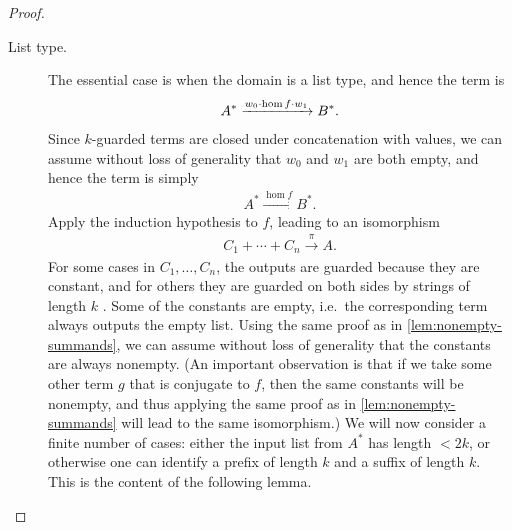 \begin{proof}
\begin{description}



    
    
    \item[List type.]
    The essential case is when the domain is a list type, and hence the  term is 
    \begin{align*}
    A^* \xrightarrow {w_0 \cdot \hom f \cdot w_1} B^*.
    \end{align*}
    Since $k$-guarded terms are closed under concatenation with values, we can assume without loss of generality that $w_0$ and $w_1$ are both empty, and hence the term is simply 
    \begin{align*}
    A^* \xrightarrow {\hom f} B^*.
    \end{align*}
    Apply the induction hypothesis to $f$, leading to an isomorphism
    \begin{align*}
     C_1 + \cdots + C_n \xrightarrow{\pi} A.
    \end{align*}
    For some cases in $C_1,\ldots,C_n$, the outputs are guarded because they are constant, and for others they are guarded on both sides by strings of length $k$ . Some of the constants are empty, i.e.~the corresponding term always outputs the empty list. Using the same proof as in \cref{lem:nonempty-summands}, we can assume without loss of generality that the constants are always nonempty. (An important observation is that if we take some other term $g$ that is conjugate to $f$, then the same constants will be nonempty, and thus applying the same proof as in \cref{lem:nonempty-summands} will lead to the same isomorphism.) We will now consider a finite number of cases: either the input list from $A^*$ has length $<2k$, or otherwise one can identify a prefix of length $k$ and a suffix of length $k$. This is the content of the following lemma. 


\end{description}
\end{proof}
